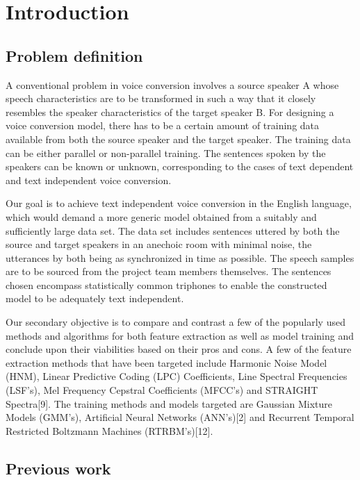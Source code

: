 \documentclass[BTech]{nitkdiss}
\begin{document}
\newpage
\tableofcontents
\listoffigures
\newpage
\pagestyle{plain}

\chapter{\vspace{10px} Introduction}
\section{ Problem definition } 
A conventional problem in voice conversion involves a source speaker A whose speech characteristics are to be transformed in such a way that it closely resembles the speaker characteristics of the target speaker B. For designing a voice conversion model, there has to be a certain amount of training data available from both the source speaker and the target speaker. The training data can be either parallel or non-parallel training. The sentences spoken by the speakers can be known or unknown, corresponding to the cases of text dependent and text independent voice conversion.

Our goal is to achieve text independent voice conversion in the English language, which would demand a more generic model obtained from a suitably and sufficiently large data set. The data set includes sentences uttered by both the source and target speakers in an anechoic room with minimal noise, the utterances by both being as synchronized in time as possible. The speech samples are to be sourced from the project team members themselves. The sentences chosen encompass statistically common triphones to enable the constructed model to be adequately text independent.

Our secondary objective is to compare and contrast a few of the popularly used methods and algorithms for both feature extraction as well as model training and conclude upon their viabilities based on their pros and cons. A few of the feature extraction methods that have been targeted include Harmonic Noise Model (HNM), Linear Predictive Coding (LPC) Coefficients, Line Spectral Frequencies (LSF's), Mel Frequency Cepstral Coefficients (MFCC's) and STRAIGHT Spectra[9]. The training methods and models targeted are Gaussian Mixture Models (GMM's), Artificial Neural Networks (ANN's)[2] and Recurrent Temporal Restricted Boltzmann Machines (RTRBM's)[12]. 

\section{Previous work}
\end{document}
